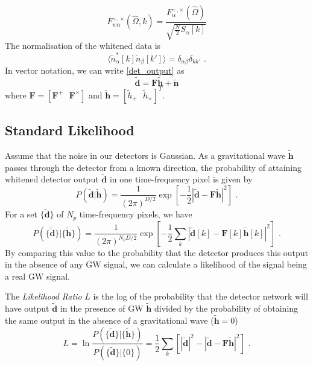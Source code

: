 \documentclass[11pt]{cuthesis}
\newcommand{\fs}{\text{ .}}
\newcommand{\tbd}{\tilde{\textbf{d}}}
\newcommand{\tbh}{\tilde{\textbf{h}}}
\begin{document}
\begin{equation}
F^{+,\times}_{w\alpha}(\hat{\Omega},k)=\frac{F^{+,\times}_\alpha (\hat{\Omega})}{\sqrt{\frac{N}{2}S_\alpha [k]}}
\end{equation}
The normalisation of the whitened data is 
\begin{equation}
\langle  \tilde{n}^*_\alpha [k] \tilde{n}_\beta [k']  \rangle = \delta _{\alpha \beta} \delta _{k k'}  \fs
\end{equation}
In vector notation, we can write \ref{det_output} as
\begin{equation}
\tilde{\textbf{d}}=\textbf{F}\tilde{\textbf{h}}+\tilde{\textbf{n}} 
\end{equation}
where $\textbf{F}=[\textbf{F}^+ \:\:\:\textbf{F}^\times]$ and $\tilde{\textbf{h}}=[\tilde{h}_+ \:\:\: \tilde{h}_\times]^T$.

\subsection{Standard Likelihood}
Assume that the noise in our detectors is Gaussian. As a gravitational wave $\tilde{\textbf{h}}$ passes through the detector from a known direction, the probability of attaining whitened detector output $\tilde{\textbf{d}}$ in one time-frequency pixel is given by
\begin{equation}
P(\tilde{\textbf{d}}|\tilde{\textbf{h}})=\frac{1}{(2\pi )^{D/2}}\exp \left[ -\frac{1}{2} \left| \tbd - \textbf{F} \tbh  \right|^2 \right] \fs
\end{equation}  
For a set $\{ \tbd \}$ of $N_p$ time-frequency pixels, we have
\begin{equation}
P(\{ \tilde{\textbf{d}} \}|\{ \tilde{\textbf{h}} \})=\frac{1}{(2\pi )^{N_p D/2}}\exp \left[- \frac{1}{2} \sum_k \left| \tbd [k] - \textbf{F}[k] \tbh [k]  \right|^2 \right] \fs
\end{equation}  
By comparing this value to the probability that the detector produces this output in the absence of any GW signal, we can calculate a likelihood of the signal being a real GW signal. 

The \emph{Likelihood Ratio} $L$ is the log of the probability that the detector network will have output $ \tilde{\textbf{d}}$ in the presence of GW $\tbh$  divided by the probability of obtaining the same output in the absence of a gravitational wave ($\tbh=0$)
\begin{equation}
L=\ln \frac{P(\{ \tilde{\textbf{d}} \}|\{ \tilde{\textbf{h}} \})}{P(\{ \tilde{\textbf{d}} \}|\{ 0  \})}= \frac{1}{2} \sum_k \left[ \left| \tbd  \right|^2 - \left| \tbd - \textbf{F} \tbh   \right|^2  \right] \fs
\end{equation}
\end{document}
